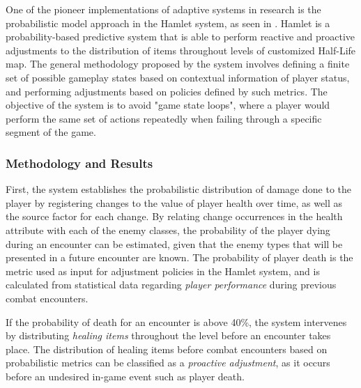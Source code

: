 
One of the pioneer implementations of adaptive systems in research is the probabilistic model approach in the Hamlet system, as seen in \cite{article_casefordynamicdifficulty}. Hamlet is a probability-based predictive system that is able to perform reactive and proactive adjustments to the distribution of items throughout levels of customized Half-Life  map. The general methodology proposed by the system involves defining a finite set of possible gameplay states based on contextual information of player status, and performing adjustments based on policies defined by such metrics. The objective of the system is to avoid "game state loops", where a player would perform the same set of actions repeatedly when failing through a specific segment of the game.

\subsubsection{Methodology and Results} 

First, the system establishes the probabilistic distribution of damage done to the player by registering changes to the value of player health over time, as well as the source factor for each change. By relating change occurrences in the health attribute with each of the enemy classes, the probability of the player dying during an encounter can be estimated, given that the enemy types that will be presented in a future encounter are known. The probability of player death is the metric used as input for adjustment policies in the Hamlet system, and is calculated from statistical data regarding \emph{player performance} during previous combat encounters.

If the probability of death for an encounter is above 40\%, the system intervenes by distributing \emph{healing items} throughout the level before an encounter takes place. The distribution of healing items before combat encounters based on probabilistic metrics can be classified as a \emph{proactive adjustment}, as it occurs before an undesired in-game event such as player death.

